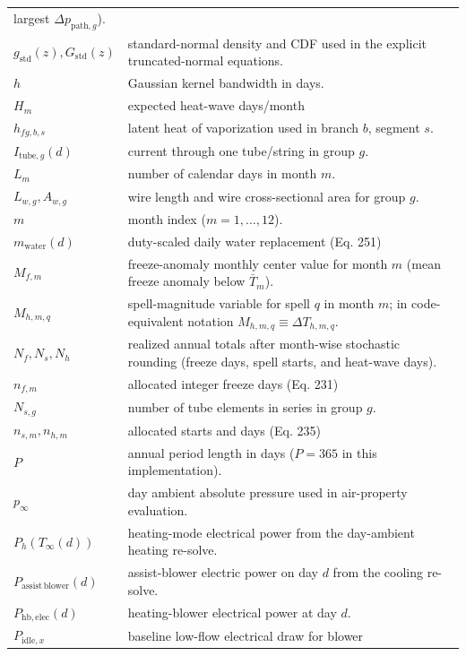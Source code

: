 {\begin{longtable}[]{@{}
  >{\raggedright\arraybackslash}p{}
  >{\raggedright\arraybackslash}p{}@{}}
largest \(\Delta p_{\mathrm{path},g}\)). \\
\(g_{\mathrm{std}}(z),G_{\mathrm{std}}(z)\) & standard-normal density
and CDF used in the explicit truncated-normal equations. \\
\(h\) & Gaussian kernel bandwidth in days. \\
\(H_m\) & expected heat-wave days/month \\
\(h_{fg,b,s}\) & latent heat of vaporization used in branch \(b\),
segment \(s\). \\
\(I_{\mathrm{tube},g}(d)\) & current through one tube/string in group
\(g\). \\
\(L_m\) & number of calendar days in month \(m\). \\
\(L_{w,g},A_{w,g}\) & wire length and wire cross-sectional area for
group \(g\). \\
\(m\) & month index (\(m=1,\dots,12\)). \\
\(m_{\mathrm{water}}(d)\) & duty-scaled daily water replacement (Eq.
251) \\
\(M_{f,m}\) & freeze-anomaly monthly center value for month \(m\) (mean
freeze anomaly below \(\bar T_m\)). \\
\(M_{h,m,q}\) & spell-magnitude variable for spell \(q\) in month \(m\);
in code-equivalent notation \(M_{h,m,q}\equiv \Delta T_{h,m,q}\). \\
\(N_f,N_s,N_h\) & realized annual totals after month-wise stochastic
rounding (freeze days, spell starts, and heat-wave days). \\
\(n_{f,m}\) & allocated integer freeze days (Eq. 231) \\
\(N_{s,g}\) & number of tube elements in series in group \(g\). \\
\(n_{s,m},n_{h,m}\) & allocated starts and days (Eq. 235) \\
\(P\) & annual period length in days (\(P=365\) in this
implementation). \\
\(p_\infty\) & day ambient absolute pressure used in air-property
evaluation. \\
\(P_h(T_\infty(d))\) & heating-mode electrical power from the
day-ambient heating re-solve. \\
\(P_{\mathrm{assist\,blower}}(d)\) & assist-blower electric power on day
\(d\) from the cooling re-solve. \\
\(P_{\mathrm{hb},\mathrm{elec}}(d)\) & heating-blower electrical power
at day \(d\). \\
\(P_{\mathrm{idle},x}\) & baseline low-flow electrical draw for blower

\end{longtable}}
